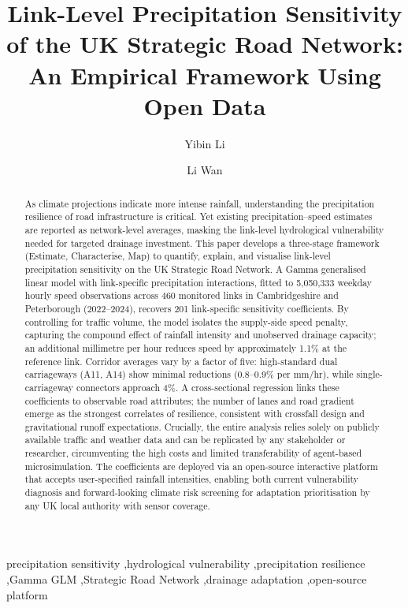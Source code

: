 \documentclass[review,authoryear]{elsarticle}
\begin{document}
\begin{frontmatter}

\title{Link-Level Precipitation Sensitivity of the UK Strategic Road Network: An Empirical Framework Using Open Data}

\author[cam]{Yibin Li}
\author[cam]{Li Wan}


\begin{abstract}
As climate projections indicate more intense rainfall, understanding the precipitation resilience of road infrastructure is critical. Yet existing precipitation--speed estimates are reported as network-level averages, masking the link-level hydrological vulnerability needed for targeted drainage investment. This paper develops a three-stage framework (Estimate, Characterise, Map) to quantify, explain, and visualise link-level precipitation sensitivity on the UK Strategic Road Network. A Gamma generalised linear model with link-specific precipitation interactions, fitted to 5,050,333 weekday hourly speed observations across 460 monitored links in Cambridgeshire and Peterborough (2022--2024), recovers 201 link-specific sensitivity coefficients. By controlling for traffic volume, the model isolates the supply-side speed penalty, capturing the compound effect of rainfall intensity and unobserved drainage capacity; an additional millimetre per hour reduces speed by approximately 1.1\% at the reference link. Corridor averages vary by a factor of five: high-standard dual carriageways (A11, A14) show minimal reductions (0.8--0.9\% per \si{mm/hr}), while single-carriageway connectors approach 4\%. A cross-sectional regression links these coefficients to observable road attributes; the number of lanes and road gradient emerge as the strongest correlates of resilience, consistent with crossfall design and gravitational runoff expectations. Crucially, the entire analysis relies solely on publicly available traffic and weather data and can be replicated by any stakeholder or researcher, circumventing the high costs and limited transferability of agent-based microsimulation. The coefficients are deployed via an open-source interactive platform that accepts user-specified rainfall intensities, enabling both current vulnerability diagnosis and forward-looking climate risk screening for adaptation prioritisation by any UK local authority with sensor coverage.
\end{abstract}

\begin{keyword}
precipitation sensitivity \sep hydrological vulnerability \sep precipitation resilience \sep Gamma GLM \sep Strategic Road Network \sep drainage adaptation \sep open-source platform
\end{keyword}

\end{frontmatter}
\enlargethispage{2\baselineskip}
\end{document}
